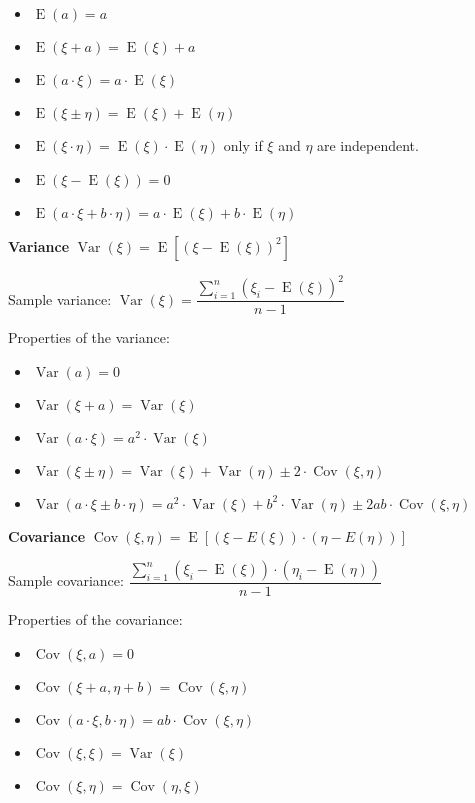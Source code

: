 \documentclass[10pt, a4paper, landscape]{article}
\DeclareMathOperator{\E}{E}
\DeclareMathOperator{\Var}{Var}
\DeclareMathOperator{\Cov}{Cov}
\begin{document}
\begin{multicols}{3}
\begin{itemize}[leftmargin=*]
	\item \( \E(a) = a \)
	\item \( \E(\xi + a) = \E(\xi) + a \)
	\item \( \E(a \cdot \xi) = a \cdot \E(\xi) \)
	\item \( \E(\xi \pm \eta) = \E(\xi) + \E(\eta) \)
	\item \( \E(\xi \cdot \eta) = \E(\xi) \cdot \E(\eta) \) \quad only if \( \xi \) and \( \eta \) are independent.
	\item \( \E(\xi - \E(\xi)) = 0 \)
	\item \( \E(a \cdot \xi + b \cdot \eta) = a \cdot \E(\xi) + b \cdot \E(\eta) \)
\end{itemize}

\textbf{Variance} \quad \( \Var(\xi) = \E \left[ (\xi - \E(\xi))^{2} \right] \)

Sample variance: \quad \( \Var(\xi) = \dfrac{\sum_{i = 1}^{n} (\xi_{i} - \E(\xi))^2}{n - 1} \)

Properties of the variance:

\begin{itemize}[leftmargin=*]
	\item \( \Var(a) = 0 \)
	\item \( \Var(\xi + a) = \Var(\xi) \)
	\item \( \Var(a \cdot \xi) = a^{2} \cdot \Var(\xi) \)
	\item \( \Var(\xi \pm \eta) = \Var(\xi) + \Var(\eta) \pm 2 \cdot \Cov(\xi, \eta) \)
	\item \( \Var(a \cdot \xi \pm b \cdot \eta) = a^{2} \cdot \Var(\xi) + b^{2} \cdot \Var(\eta) \pm 2 a b \cdot \Cov(\xi, \eta) \)
\end{itemize}

\textbf{Covariance} \quad \( \Cov(\xi, \eta) = \E \left[ (\xi - E(\xi)) \cdot (\eta - E(\eta)) \right] \)

Sample covariance: \quad \( \dfrac{\sum_{i = 1}^{n} (\xi_{i} - \E(\xi)) \cdot (\eta_{i} - \E(\eta))}{n - 1} \)

Properties of the covariance:

\begin{itemize}[leftmargin=*]
	\item \( \Cov(\xi, a) = 0 \)
	\item \( \Cov(\xi + a, \eta + b) = \Cov(\xi, \eta) \)
	\item \( \Cov(a \cdot \xi, b \cdot \eta) = a b \cdot \Cov(\xi, \eta) \)
	\item \( \Cov(\xi, \xi) = \Var(\xi) \)
	\item \( \Cov(\xi, \eta) = \Cov(\eta, \xi) \)
\end{itemize}


\end{multicols}
\end{document}
